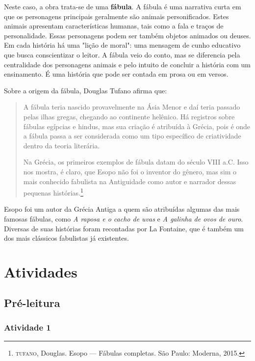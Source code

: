 \documentclass[11pt]{extarticle}
\begin{document}
Neste caso, a obra trata-se de uma \textbf{fábula}. A fábula é uma narrativa curta em que os personagens principais geralmente são animais personificados.  Estes animais apresentam características humanas, tais como a fala e traços de personalidade. Essas personagens podem ser também objetos animados ou deuses. Em cada história há uma "lição de moral": uma mensagem de cunho educativo que busca conscientizar o leitor. A fábula veio do conto, mas se diferencia pela centralidade dos personagens animais e pelo intuito de concluir a história com um ensinamento. É uma história que pode ser contada em prosa ou em versos. 

Sobre a origem da fábula, Douglas Tufano afirma que:

\begin{quote} A fábula teria nascido provavelmente na Ásia Menor e daí teria passado pelas ilhas gregas, chegando ao continente helênico. Há registros sobre fábulas egípcias e hindus, mas sua criação é atribuída à Grécia, pois é onde a fábula passa a ser considerada como um tipo específico de criatividade dentro da teoria literária. 

Na Grécia, os primeiros exemplos de fábula datam do século VIII a.C. Isso nos mostra, é claro, que Esopo não foi o inventor do gênero, mas sim o mais conhecido fabulista na Antiguidade como autor e narrador dessas pequenas histórias.\footnote{\textsc{tufano}, Douglas. Esopo --- Fábulas completas. São Paulo: Moderna, 2015.}\end{quote}

Esopo foi um autor da Grécia Antiga a quem são atribuídas algumas das mais famosas fábulas, como \textit{A raposa e o cacho de uvas} e \textit{A galinha de ovos de ouro}. Diversas de suas histórias foram recontadas por La Fontaine, que é também um dos mais clássicos fabulistas já existentes. 

\section{Atividades}

\subsection{Pré-leitura}

\subsubsection{Atividade 1}
\end{document}
